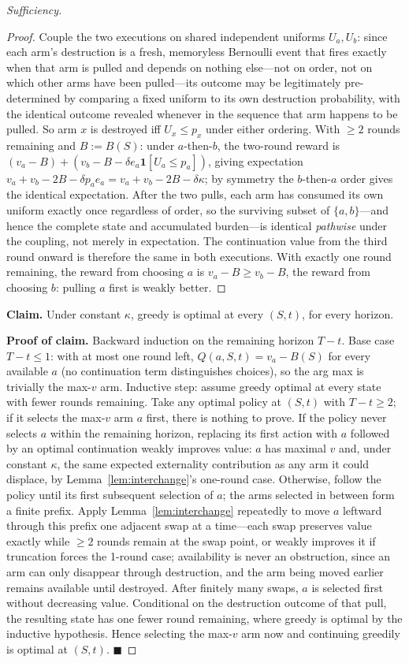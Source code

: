 \begin{proof}[Sufficiency]
\begin{proof}
Couple the two executions on shared independent uniforms $U_a,U_b$: since each
arm's destruction is a fresh, memoryless Bernoulli event that fires exactly
when that arm is pulled and depends on nothing else---not on order, not on
which other arms have been pulled---its outcome may be legitimately
pre-determined by comparing a fixed uniform to its own destruction
probability, with the identical outcome revealed whenever in the sequence
that arm happens to be pulled. So arm $x$ is destroyed iff $U_x \le p_x$
under either ordering. With $\ge2$ rounds
remaining and $B:=B(S)$: under $a$-then-$b$, the two-round reward is
$(v_a-B) + (v_b - B - \delta e_a \mathbf{1}[U_a\le p_a])$, giving expectation
$v_a+v_b-2B-\delta p_a e_a = v_a+v_b-2B-\delta\kappa$; by symmetry the
$b$-then-$a$ order gives the identical expectation. After the two pulls,
each arm has consumed its own uniform exactly once regardless of order, so
the surviving subset of $\{a,b\}$---and hence the complete state and
accumulated burden---is identical \emph{pathwise} under the coupling, not
merely in expectation. The continuation value from the third round onward is
therefore the same in both executions. With exactly one round remaining,
the reward from choosing $a$ is $v_a-B \ge v_b-B$, the reward from choosing
$b$: pulling $a$ first is weakly better.
\end{proof}

\medskip\noindent\textbf{Claim.} Under constant $\kappa$, greedy is optimal
at every $(S,t)$, for every horizon.

\smallskip\noindent\textbf{Proof of claim.}
Backward induction on the remaining horizon $T-t$. Base case $T-t\le1$: with
at most one round left, $Q(a,S,t)=v_a-B(S)$ for every available $a$ (no
continuation term distinguishes choices), so the arg max is trivially the
max-$v$ arm. Inductive step: assume greedy optimal at every state with fewer
rounds remaining. Take any optimal policy at $(S,t)$ with $T-t\ge2$; if it
selects the max-$v$ arm $a$ first, there is nothing to prove. If the policy
never selects $a$ within the remaining horizon, replacing its first action
with $a$ followed by an optimal continuation weakly improves value: $a$ has
maximal $v$ and, under constant $\kappa$, the same expected externality
contribution as any arm it could displace, by Lemma~\ref{lem:interchange}'s
one-round case. Otherwise, follow the policy until its first subsequent
selection of $a$; the arms selected in between form a finite prefix. Apply
Lemma~\ref{lem:interchange}
repeatedly to move $a$ leftward through this prefix one adjacent swap at a
time---each swap preserves value exactly while $\ge2$ rounds remain at the
swap point, or weakly improves it if truncation forces the 1-round case;
availability is never an obstruction, since an arm can only disappear
through destruction, and the arm being moved earlier remains available until
destroyed. After finitely many swaps, $a$ is selected first without
decreasing value. Conditional on the destruction outcome of that pull, the
resulting state has one fewer round remaining, where greedy is optimal by
the inductive hypothesis. Hence selecting the max-$v$ arm now and continuing
greedily is optimal at $(S,t)$. $\blacksquare$


\end{proof}
